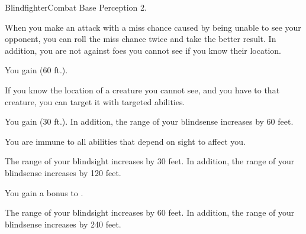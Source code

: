     \begin{feat}{Blindfighter}{Combat}
        \featpre Base Perception 2.

         When you make an attack with a miss chance caused by being unable to see your opponent, you can roll the miss chance twice and take the better result.
        In addition, you are not  against foes you cannot see if you know their location.

         You gain  (60 ft.).

         If you know the location of a creature you cannot see, and you have  to that creature, you can target it with targeted abilities.

         You gain  (30 ft.).
        In addition, the range of your blindsense increases by 60 feet.

         You are immune to all abilities that depend on sight to affect you.

         The range of your blindsight increases by 30 feet.
        In addition, the range of your blindsense increases by 120 feet.

         You gain a  bonus to .

         The range of your blindsight increases by 60 feet.
        In addition, the range of your blindsense increases by 240 feet.
    \end{feat}

